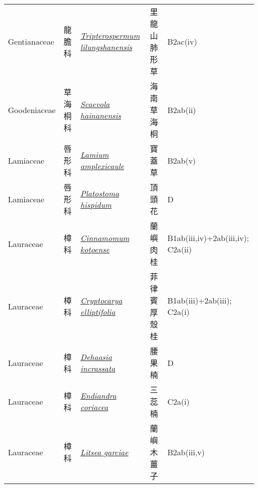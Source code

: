 {\begin{longtable}{L{2.5cm}L{2cm}L{5cm}L{2.5cm}L{3cm}}
    Gentianaceae & 龍膽科 & \href{http://www.theplantlist.org/tpl1.1/search?q=Tripterospermum+lilungshanensis}{\textit{Tripterospermum lilungshanensis} } & 里龍山肺形草 & B2ac(iv)    \\
    Goodeniaceae & 草海桐科 & \href{http://www.theplantlist.org/tpl1.1/search?q=Scaevola+hainanensis}{\textit{Scaevola hainanensis} } & 海南草海桐 & B2ab(ii)    \\
    Lamiaceae & 唇形科 & \href{http://www.theplantlist.org/tpl1.1/search?q=Lamium+amplexicaule}{\textit{Lamium amplexicaule} } & 寶蓋草 & B2ab(v)    \\
    Lamiaceae & 唇形科 & \href{http://www.theplantlist.org/tpl1.1/search?q=Platostoma+hispidum}{\textit{Platostoma hispidum} } & 頂頭花 & D    \\
    Lauraceae & 樟科 & \href{http://www.theplantlist.org/tpl1.1/search?q=Cinnamomum+kotoense}{\textit{Cinnamomum kotoense} } & 蘭嶼肉桂 & B1ab(iii,iv)+2ab(iii,iv); C2a(ii)    \\
    Lauraceae & 樟科 & \href{http://www.theplantlist.org/tpl1.1/search?q=Cryptocarya+elliptifolia}{\textit{Cryptocarya elliptifolia} } & 菲律賓厚殼桂 & B1ab(iii)+2ab(iii); C2a(i)    \\
    Lauraceae & 樟科 & \href{http://www.theplantlist.org/tpl1.1/search?q=Dehaasia+incrassata}{\textit{Dehaasia incrassata} } & 腰果楠 & D    \\
    Lauraceae & 樟科 & \href{http://www.theplantlist.org/tpl1.1/search?q=Endiandra+coriacea}{\textit{Endiandra coriacea} } & 三蕊楠 & C2a(i)    \\
    Lauraceae & 樟科 & \href{http://www.theplantlist.org/tpl1.1/search?q=Litsea+garciae}{\textit{Litsea garciae} } & 蘭嶼木薑子 & B2ab(iii,v)    \\

\end{longtable}}
